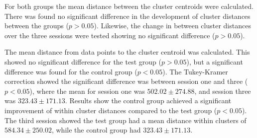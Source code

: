 For both groups the mean distance between the cluster centroids were calculated. There was found no significant difference in the development of cluster distances between the groups ($p > 0.05$). Likewise, the change in between cluster distances over the three sessions were tested showing no significant difference ($p > 0.05$).

The mean distance from data points to the cluster centroid was calculated. This showed no significant difference for the test group ($p > 0.05$), but a significant difference was found for the control group ($p < 0.05$). The Tukey-Kramer correction showed the significant difference was between session one and three ($p < 0.05$), where the mean for session one was $502.02 \pm 274.88$, and session three was $323.43 \pm 171.13$. Results show the control group achieved a significant improvement of within cluster distances compared to the test group ($p < 0.05$). The third session showed the test group had a mean distance within clusters of $584.34 \pm 250.02$, while the control group had $323.43 \pm 171.13$. 
